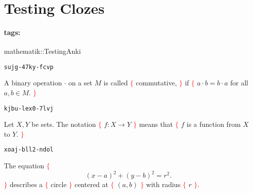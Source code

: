 \documentclass[12pt]{article}
\newcommand*{\tags}[1]{\paragraph{tags: }#1\bigskip}
\newenvironment{field}{}{}
\newcommand*{\xplain}[1]{\begin{mdframed}\texttt{#1}\end{mdframed}\bigskip}
\newenvironment{note}{}{}
\newenvironment{clozefield}{}{}
\newenvironment{cloze}{\textcolor{red}{$\{$}}{\textcolor{red}{$\}$}}
\begin{document}
\section{Testing Clozes}
\tags{mathematik::TestingAnki}

\begin{note}
    \xplain{sujg-47ky-fcvp}
    \begin{clozefield}
        A binary operation $ \cdot $ on a set $ M $ is called 
        \begin{cloze}
            commutative,
        \end{cloze}
        if 
        \begin{cloze} $ a \cdot b = b \cdot a  $ for all $ a,b \in M $. \end{cloze}
    \end{clozefield} 
    \begin{field} \end{field}
\end{note}

\begin{note}
    \xplain{kjbu-lex0-7lvj}
    \begin{clozefield}
        Let $ X,Y $ be sets. The notation \begin{cloze} $ f\colon X \rightarrow
        Y $ \end{cloze}
        means that \begin{cloze} $ f $ is a function from $ X $ to $ Y $. \end{cloze}
    \end{clozefield}
\end{note}

\begin{note}
    \xplain{xoaj-bll2-ndol}
    \begin{clozefield}
        The equation 
        \begin{cloze}
            \begin{equation*}
                { (x-a)^{2}+(y-b)^{2}=r^{2}.}
            \end{equation*}
        \end{cloze}
        describes a 
        \begin{cloze} circle \end{cloze} centered at \begin{cloze}  
        $(a,b)$ \end{cloze} with radius \begin{cloze} 
        $ r $ \end{cloze}.
    \end{clozefield}
\end{note}
\end{document}
